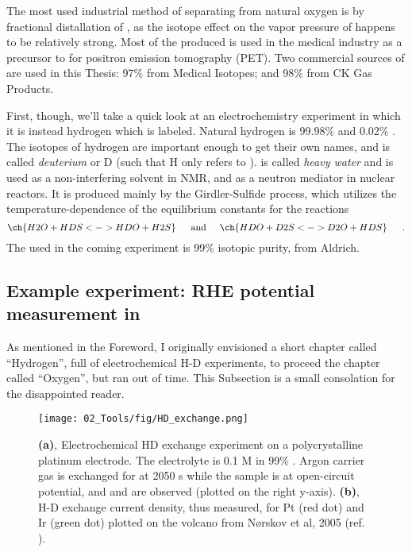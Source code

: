 The most used industrial method of separating  from natural oxygen is by fractional distallation of , as the isotope effect on the vapor pressure of  happens to be relatively strong\cite{Disbudak2018}. Most of the  produced is used in the medical industry as a precursor to  for positron emission tomography (PET).  Two commercial sources of  are used in this Thesis: 97\%  from Medical Isotopes; and 98\%  from CK Gas Products.

First, though, we'll take a quick look at an electrochemistry experiment in which it is instead hydrogen which is labeled. Natural hydrogen is 99.98\%  and 0.02\% . The isotopes of hydrogen are important enough to get their own names, and  is called \textit{deuterium} or D (such that H only refers to ).  is called \textit{heavy water} and is used as a non-interfering solvent in NMR, and as a neutron mediator in nuclear reactors. It is produced mainly by the Girdler-Sulfide process, which utilizes the temperature-dependence of the equilibrium constants for the reactions\cite{Agarwal2016}
\begin{equation}
\ch{H2O + HDS <-> HDO + H2S}\,\hspace{5mm}\text{and}\hspace{5mm}\ch{HDO + D2S <-> D2O + HDS}\hspace{5mm}\,.
\end{equation} 
The  used in the coming experiment is 99\% isotopic purity, from Aldrich.


\subsection{Example experiment: RHE potential measurement in }\label{subsec:isotope_RHE}
As mentioned in the Foreword, I originally envisioned a short chapter called ``Hydrogen'', full of electrochemical H-D experiments, to proceed the chapter called ``Oxygen'', but ran out of time. This Subsection is a small consolation for the disappointed reader.

\begin{figure}[h!]
	\centering
	\texttt{[image: 02\_Tools/fig/HD\_exchange.png]}
	\caption{\textbf{(a)}, Electrochemical HD exchange experiment on a polycrystalline platinum electrode. The electrolyte is 0.1 M  in 99\% . Argon carrier gas is exchanged for  at 2050 s while the sample is at open-circuit potential, and  and  are observed (plotted on the right y-axis). \textbf{(b)}, H-D exchange current density, thus measured, for Pt (red dot) and Ir (green dot) plotted on the volcano from N\o rskov et al, 2005 (ref. \cite{Nørskov2005a}).}
	\label{fig:HD}
\end{figure}


